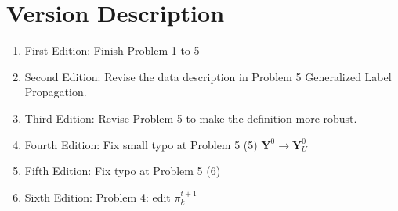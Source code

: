 \documentclass{article}
\begin{document}
 \section*{Version Description}
 \begin{enumerate}
     \item First Edition: Finish Problem 1 to 5
     \item Second Edition: Revise the data description in Problem 5 Generalized Label Propagation.
     \item Third Edition: Revise Problem 5 to make the definition more robust.
     \item Fourth Edition: Fix small typo at Problem 5 (5) $\boldsymbol{Y}^0 \rightarrow \boldsymbol{Y}_U^0$
     \item Fifth Edition: Fix typo at Problem 5 (6)
      \item Sixth Edition: Problem 4: edit $\pi_k^{t+1}$ 
 \end{enumerate}
\end{document}
